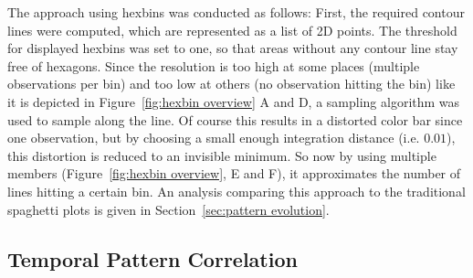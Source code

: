 The approach using hexbins was conducted as follows: First, the required contour lines were computed, which are represented as a list of 2D points. 
The threshold for displayed hexbins was set to one, so that areas without any contour line stay free of hexagons. 
Since the resolution is too high at some places (multiple observations per bin) and too low at others (no observation hitting the bin) like it is depicted in Figure~\ref{fig:hexbin overview} A and D, a sampling algorithm  was used to sample along the line. 
Of course this results in a distorted color bar since one observation, but by choosing a small enough integration distance (i.e. $0.01$), this distortion is reduced to an invisible minimum. 
So now by using multiple members (Figure~\ref{fig:hexbin overview}, E and F), it approximates the number of lines hitting a certain bin. 
An analysis comparing this approach to the traditional spaghetti plots is given in Section~\ref{sec:pattern evolution}. 


\subsection{Temporal Pattern Correlation} %
\label{sec:Temporal Pattern Correlation}

